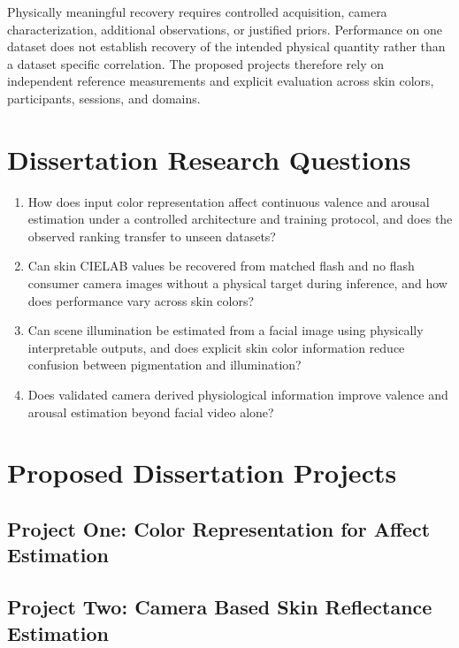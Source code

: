 \documentclass[12pt]{article}
\begin{document}
Physically meaningful recovery requires controlled acquisition, camera characterization, additional observations, or justified priors. Performance on one dataset does not establish recovery of the intended physical quantity rather than a dataset specific correlation. The proposed projects therefore rely on independent reference measurements and explicit evaluation across skin colors, participants, sessions, and domains.

\section{Dissertation Research Questions}

\begin{enumerate}
\item How does input color representation affect continuous valence and arousal estimation under a controlled architecture and training protocol, and does the observed ranking transfer to unseen datasets?
\item Can skin CIELAB values be recovered from matched flash and no flash consumer camera images without a physical target during inference, and how does performance vary across skin colors?
\item Can scene illumination be estimated from a facial image using physically interpretable outputs, and does explicit skin color information reduce confusion between pigmentation and illumination?
\item Does validated camera derived physiological information improve valence and arousal estimation beyond facial video alone?
\end{enumerate}

\section{Proposed Dissertation Projects}

\subsection{Project One: Color Representation for Affect Estimation}

\subsection{Project Two: Camera Based Skin Reflectance Estimation}
\end{document}
